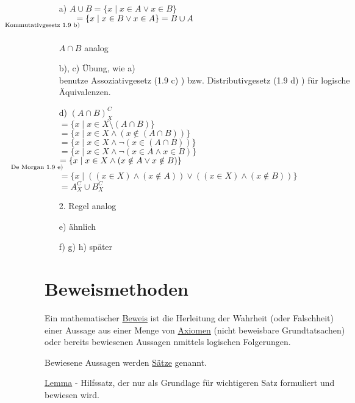 \documentclass[a4paper, 12pt, twoside] {article}
\begin{document}
\begin{itemize}
	\item[a)]
		$A \cup B = \{x \mid x \in A \lor x \in B\}$ \\
		$\qquad \underset{\mathllap{\text{Kommutativgesetz 1.9 b)}}}{=} \{x \mid x \in B \lor x \in A\} = B \cup A$ \\		
		\hfill \\		
		$A \cap B$ analog
		
	\item[b), c)]
		Übung, wie a) \\
		benutze Assoziativgesetz (1.9 c) ) bzw. Distributivgesetz (1.9 d) ) für logische Äquivalenzen.
		
	\item[d)]
		$(A \cap B)^C_X$ \\
		$ = \{x \mid x \in X \setminus (A \cap B) \}$ \\
		$ = \{x \mid x \in X \land (x \notin (A \cap B)) \}$ \\
		$ = \{x \mid x \in X \land \neg (x \in (A \cap B)) \}$ \\
		$ = \{x \mid x \in X \land \neg (x \in A \land x \in B) \}$ \\
		$ \underset{\mathllap{\text{De Morgan 1.9 e)}}}{=} \{x \mid x \in X \land (x \notin A \lor x \notin B)\}$ \\
		$ = \{x \mid ((x \in X) \land (x \notin A)) \lor ((x \in X) \land (x \notin B)) \}$ \\
		$ = A^C_X \cup B^C_X$
		
		2. Regel analog
		
	\item[e)]
		ähnlich
	\item[f) g) h)]
		später
\end{itemize}

\section{Beweismethoden}

Ein mathematischer \underline{Beweis} ist die Herleitung der Wahrheit (oder Falschheit) einer Aussage aus einer Menge von \underline{Axiomen} (nicht beweisbare Grundtatsachen) oder bereits bewiesenen Aussagen nmittels logischen Folgerungen.

Bewiesene Aussagen werden \underline{Sätze} genannt.

\hfill

\underline{Lemma} - Hilfssatz, der nur als Grundlage für wichtigeren Satz formuliert und bewiesen wird.
\end{document}
